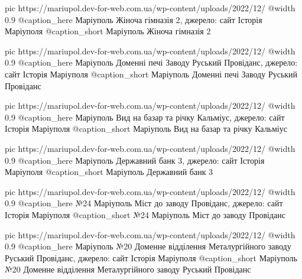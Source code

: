   pic https://mariupol.dev-for-web.com.ua/wp-content/uploads/2022/12/%
  @width 0.9
  @caption_here Маріуполь Жіноча гімназія 2, джерело: сайт Історія Маріуполя
  @caption_short Маріуполь Жіноча гімназія 2

  pic https://mariupol.dev-for-web.com.ua/wp-content/uploads/2022/12/%
  @width 0.9
  @caption_here Маріуполь Доменні печі Заводу Руський Провіданс, джерело: сайт Історія Маріуполя
  @caption_short Маріуполь Доменні печі Заводу Руський Провіданс

  pic https://mariupol.dev-for-web.com.ua/wp-content/uploads/2022/12/%
  @width 0.9
  @caption_here Маріуполь Вид на базар та річку Кальміус, джерело: сайт Історія Маріуполя
  @caption_short Маріуполь Вид на базар та річку Кальміус

  pic https://mariupol.dev-for-web.com.ua/wp-content/uploads/2022/12/%
  @width 0.9
  @caption_here Маріуполь Державний банк 3, джерело: сайт Історія Маріуполя
  @caption_short Маріуполь Державний банк 3

  pic https://mariupol.dev-for-web.com.ua/wp-content/uploads/2022/12/%
  @width 0.9
  @caption_here №24 Маріуполь Міст до заводу Провіданс, джерело: сайт Історія Маріуполя
  @caption_short №24 Маріуполь Міст до заводу Провіданс

  pic https://mariupol.dev-for-web.com.ua/wp-content/uploads/2022/12/%
  @width 0.9
  @caption_here Маріуполь №20 Доменне відділення Металургійного заводу Руський Провіданс, джерело: сайт Історія Маріуполя
  @caption_short Маріуполь №20 Доменне відділення Металургійного заводу Руський Провіданс

